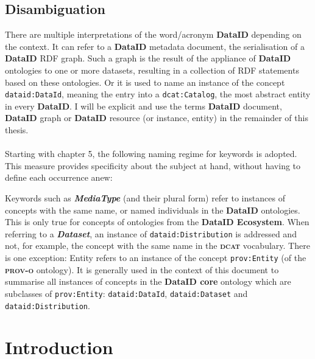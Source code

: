 \documentclass[a4paper,english,twoside,BCOR1.5cm,headsepline,DIV12,appendixprefix,final,12pt]{scrbook}
\newcommand{\ecosystem}{{\ttfamily\bfseries DataID Ecosystem}\xspace}
\newcommand{\dataid}{{\ttfamily\bfseries DataID}\xspace}
\newcommand{\core}{{\ttfamily\bfseries DataID core}\xspace}
\newcommand{\prov}{{\scshape\bfseries prov-o}\xspace}
\newcommand{\dcat}{{\scshape\bfseries dcat}\xspace}
\newcommand{\prop}[1]{{{\texttt{#1}}}}
\newcommand{\important}[1]{\textbf{\textit{#1}}}
\begin{document}
\newpage
\thispagestyle{empty}
\section*{Disambiguation}
There are multiple interpretations of the word/acronym \dataid depending on the context. It can refer to a \dataid metadata document, the serialisation of a \dataid RDF graph. Such a graph is the result of the appliance of \dataid ontologies to one or more datasets, resulting in a collection of RDF statements based on these ontologies. Or it is used to name an instance of the concept \prop{dataid:DataId}, meaning the entry into a \prop{dcat:Catalog}, the most abstract entity in every \dataid. I will be explicit and use the terms \dataid document, \dataid graph or \dataid resource (or instance, entity) in the remainder of this thesis.
\\\\
Starting with chapter 5, the following naming regime for keywords is adopted. This measure provides specificity about the subject at hand, without having to define each occurrence anew:

Keywords such as \important{MediaType} (and their plural form) refer to instances of concepts with the same name, or named individuals in the \dataid ontologies. This is only true for concepts of ontologies from the \ecosystem. When referring to a \important{Dataset}, an instance of \prop{dataid:Distribution} is addressed and not, for example, the concept with the same name in the \dcat vocabulary. There is one exception: Entity refers to an instance of the concept \prop{prov:Entity} (of the \prov ontology). It is generally used in the context of this document to summarise all instances of concepts in the \core ontology which are subclasses of \prop{prov:Entity}: \prop{dataid:DataId}, \prop{dataid:Dataset} and \prop{dataid:Distribution}.

\clearpage\thispagestyle{empty}\null\newpage
\clearpage\thispagestyle{empty}\null
\frenchspacing

\mainmatter

\chapter{Introduction}
\label{chap:introduction}
\end{document}
